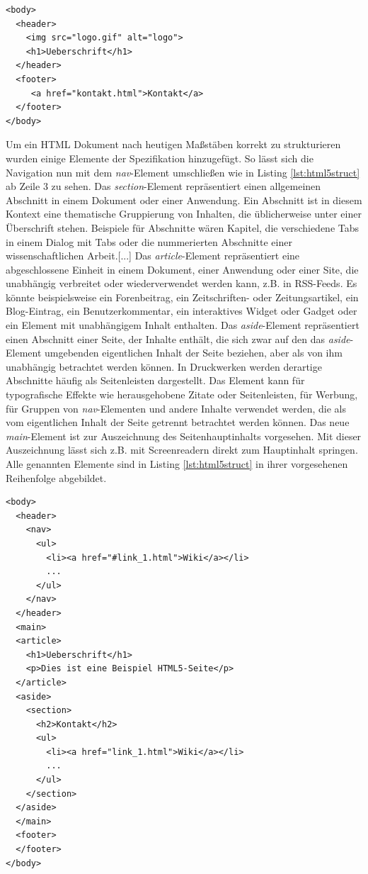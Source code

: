 \documentclass[12pt,a4paper,bibliography=totocnumbered,listof=totocnumbered]{scrartcl}
\begin{document}
    \vspace{1em}
	\begin{lstlisting}[caption=HTML5 \textit{header}- und \textit{footer}-Element, label=lst:html5header]
<body>
  <header>
    <img src="logo.gif" alt="logo">
    <h1>Ueberschrift</h1>
  </header>
  <footer>
     <a href="kontakt.html">Kontakt</a>
  </footer>
</body>
	\end{lstlisting}
	
Um ein HTML Dokument nach heutigen Maßstäben korrekt zu strukturieren wurden einige Elemente der Spezifikation hinzugefügt. So lässt sich die Navigation nun mit dem \textit{nav}-Element umschließen wie in Listing \ref{lst:html5struct} ab Zeile 3 zu sehen. \glqq Das \textit{section}-Element repräsentiert einen allgemeinen Abschnitt in einem Dokument oder einer Anwendung. Ein Abschnitt ist in diesem Kontext eine thematische Gruppierung von Inhalten, die üblicherweise unter einer Überschrift stehen. Beispiele für Abschnitte wären Kapitel, die verschiedene Tabs in einem Dialog mit Tabs oder die nummerierten Abschnitte einer wissenschaftlichen Arbeit.[...] Das \textit{article}-Element repräsentiert eine abgeschlossene Einheit in einem Dokument, einer Anwendung oder einer Site, die unabhängig verbreitet oder wiederverwendet werden kann, z.B. in RSS-Feeds. Es könnte beispielsweise ein Forenbeitrag, ein Zeitschriften- oder Zeitungsartikel, ein Blog-Eintrag, ein Benutzerkommentar, ein interaktives Widget oder Gadget oder ein Element mit unabhängigem Inhalt enthalten. Das \textit{aside}-Element repräsentiert einen Abschnitt einer Seite, der Inhalte enthält, die sich zwar auf den das \textit{aside}-Element umgebenden eigentlichen Inhalt der Seite beziehen, aber als von ihm unabhängig betrachtet werden können. In Druckwerken werden derartige Abschnitte häufig als Seitenleisten dargestellt. Das Element kann für typografische Effekte wie herausgehobene Zitate oder Seitenleisten, für Werbung, für Gruppen von \textit{nav}-Elementen und andere Inhalte verwendet werden, die als vom eigentlichen Inhalt der Seite getrennt betrachtet werden können.\grqq{}\cite[S.43]{PilgDurc2011} Das neue \textit{main}-Element ist zur Auszeichnung des Seitenhauptinhalts vorgesehen. Mit dieser Auszeichnung lässt sich z.B. mit Screenreadern direkt zum Hauptinhalt springen.  Alle genannten Elemente sind in Listing \ref{lst:html5struct} in ihrer vorgesehenen Reihenfolge abgebildet.

    \vspace{1em}
	\begin{lstlisting}[caption=HTML5 Struktur Elemente, label=lst:html5struct]
<body>
  <header>
    <nav>
      <ul>
        <li><a href="#link_1.html">Wiki</a></li>
        ...
      </ul>
    </nav>
  </header>
  <main>
  <article>
    <h1>Ueberschrift</h1>
    <p>Dies ist eine Beispiel HTML5-Seite</p>
  </article>
  <aside>
    <section>
      <h2>Kontakt</h2>
      <ul>
        <li><a href="link_1.html">Wiki</a></li>
        ...
      </ul>
    </section>
  </aside>
  </main>
  <footer>
  </footer>
</body>
	\end{lstlisting}
\end{document}
